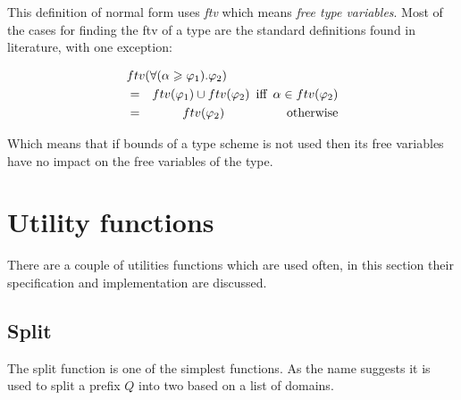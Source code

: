 \documentclass[twoside, titlepage, openright, a4paper]{book}
\renewcommand{\geq}{\geqslant}
\begin{document}
This definition of normal form uses \emph{ftv} which means \emph{free type variables}. Most of the cases for finding the ftv of a type are the standard definitions found in literature, with one exception:

\begin{eqnarray*}
\lefteqn{ftv(\forall(\alpha \geq \varphi_1).\varphi_2) }\\
  & = & ftv(\varphi_1)\cup ftv(\varphi_2) \hspace{5pt} \textrm{iff} \hspace{5pt} \alpha \in ftv(\varphi_2) \\
  & = & ftv(\varphi_2) \hspace{50pt} \textrm{otherwise}
\end{eqnarray*}

Which means that if bounds of a type scheme is not used then its free variables have no impact on the free variables of the type.
\section{Utility functions}
There are a couple of utilities functions which are used often, in this section their specification and implementation are discussed.
\subsection{Split}
The split function is one of the simplest functions. As the name suggests it is used to split a prefix $Q$ into two based on a list of domains.
\end{document}
